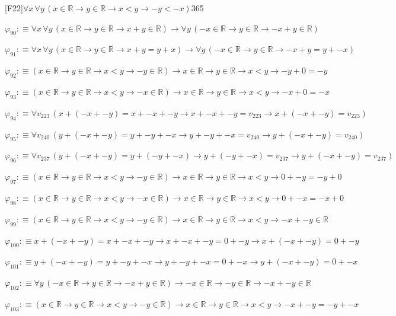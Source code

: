 \begin{fullproof}{[F22]}{$\forall x\,\forall y\,(x \in \mathbb{R} \to y \in \mathbb{R} \to x < y \to -y < -x)$}{365}
\begin{abbrevlist}
\item $\varphi_{90} :\equiv \forall x\,\forall y\,(x \in \mathbb{R} \to y \in \mathbb{R} \to x + y \in \mathbb{R}) \to \forall y\,(-x \in \mathbb{R} \to y \in \mathbb{R} \to -x + y \in \mathbb{R})$
\item $\varphi_{91} :\equiv \forall x\,\forall y\,(x \in \mathbb{R} \to y \in \mathbb{R} \to x + y = y + x) \to \forall y\,(-x \in \mathbb{R} \to y \in \mathbb{R} \to -x + y = y + -x)$
\item $\varphi_{92} :\equiv (x \in \mathbb{R} \to y \in \mathbb{R} \to x < y \to -y \in \mathbb{R}) \to x \in \mathbb{R} \to y \in \mathbb{R} \to x < y \to -y + 0 = -y$
\item $\varphi_{93} :\equiv (x \in \mathbb{R} \to y \in \mathbb{R} \to x < y \to -x \in \mathbb{R}) \to x \in \mathbb{R} \to y \in \mathbb{R} \to x < y \to -x + 0 = -x$
\item $\varphi_{94} :\equiv \forall v_{223}\,(x + (-x + -y) = x + -x + -y \to x + -x + -y = v_{223} \to x + (-x + -y) = v_{223})$
\item $\varphi_{95} :\equiv \forall v_{240}\,(y + (-x + -y) = y + -y + -x \to y + -y + -x = v_{240} \to y + (-x + -y) = v_{240})$
\item $\varphi_{96} :\equiv \forall v_{237}\,(y + (-x + -y) = y + (-y + -x) \to y + (-y + -x) = v_{237} \to y + (-x + -y) = v_{237})$
\item $\varphi_{97} :\equiv (x \in \mathbb{R} \to y \in \mathbb{R} \to x < y \to -y \in \mathbb{R}) \to x \in \mathbb{R} \to y \in \mathbb{R} \to x < y \to 0 + -y = -y + 0$
\item $\varphi_{98} :\equiv (x \in \mathbb{R} \to y \in \mathbb{R} \to x < y \to -x \in \mathbb{R}) \to x \in \mathbb{R} \to y \in \mathbb{R} \to x < y \to 0 + -x = -x + 0$
\item $\varphi_{99} :\equiv (x \in \mathbb{R} \to y \in \mathbb{R} \to x < y \to -y \in \mathbb{R}) \to x \in \mathbb{R} \to y \in \mathbb{R} \to x < y \to -x + -y \in \mathbb{R}$
\item $\varphi_{100} :\equiv x + (-x + -y) = x + -x + -y \to x + -x + -y = 0 + -y \to x + (-x + -y) = 0 + -y$
\item $\varphi_{101} :\equiv y + (-x + -y) = y + -y + -x \to y + -y + -x = 0 + -x \to y + (-x + -y) = 0 + -x$
\item $\varphi_{102} :\equiv \forall y\,(-x \in \mathbb{R} \to y \in \mathbb{R} \to -x + y \in \mathbb{R}) \to -x \in \mathbb{R} \to -y \in \mathbb{R} \to -x + -y \in \mathbb{R}$
\item $\varphi_{103} :\equiv (x \in \mathbb{R} \to y \in \mathbb{R} \to x < y \to -y \in \mathbb{R}) \to x \in \mathbb{R} \to y \in \mathbb{R} \to x < y \to -x + -y = -y + -x$

\end{abbrevlist}
\end{fullproof}
